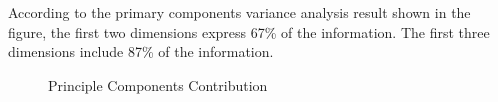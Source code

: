 According to the primary components variance analysis result shown in the figure, the first two dimensions express 67\% of the information. The first three dimensions include 87\% of the information.

\begin{figure}[H]
  \centering  %
  \caption[Principle Components Contribution]{Principle Components Contribution}    %
  \label{principlecomponentcontribution}    %
\end{figure}


